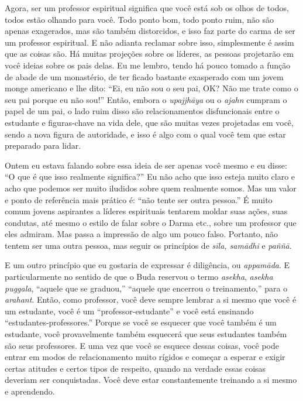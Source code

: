 Agora, ser um professor espiritual significa que você está sob os
olhos de todos, todos estão olhando para você. Todo ponto bom, todo
ponto ruim, não são apenas exagerados, mas são também distorcidos, e
isso faz parte do carma de ser um professor espiritual. E não adianta
reclamar sobre isso, simplesmente é assim que as coisas são. Há muitas
projeções sobre os líderes, as pessoas projetarão em você ideias sobre
os pais delas. Eu me lembro, tendo há pouco tomado a função de abade de
um monastério, de ter ficado bastante exasperado com um jovem monge
americano e lhe dito: “Ei, eu não sou o seu pai, OK? Não me trate como
o seu pai porque eu não sou!” Então, embora o \textit{upajjhāya} ou o
\textit{ajahn} cumpram o papel de um pai, o lado ruim disso são
relacionamentos disfuncionais entre o estudante e figuras-chave na vida
dele, que são muitas vezes projetadas em você, sendo a nova figura de
autoridade, e isso é algo com o qual você tem que estar preparado para
lidar. 

Ontem eu estava falando sobre essa ideia de ser apenas você mesmo e
eu disse: “O que é que isso realmente significa?” Eu não acho que isso
esteja muito claro e acho que podemos ser muito iludidos sobre quem
realmente somos. Mas um valor e ponto de referência mais prático é:
“não tente ser outra pessoa.” É muito comum jovens aspirantes a líderes
espirituais tentarem moldar suas ações, suas condutas, até mesmo o
estilo de falar sobre o Darma etc., sobre um professor que eles
admiram. Mas passa a impressão de algo um pouco falso. Portanto, não
tentem ser uma outra pessoa, mas seguir os princípios de
\textit{sīla, samādhi} e \textit{paññā}. 

E um outro princípio que eu gostaria de expressar é diligência, ou
\textit{appamāda}. E particularmente no sentido de que o Buda
reservou o termo \textit{asekha}, \textit{asekha puggala}, “aquele que
se graduou,” “aquele que encerrou o treinamento,” para o
\textit{arahant}. Então, como professor, você deve sempre lembrar a si
mesmo que você é um estudante, você é um “professor-estudante” e você
está ensinando “estudantes-professores.” Porque se você se esquecer que
você também é um estudante, você provavelmente também esquecerá que
seus estudantes também são seus professores. E uma vez que você se
esquece dessas coisas, você pode entrar em modos de relacionamento
muito rígidos e começar a esperar e exigir certas atitudes e certos
tipos de respeito, quando na verdade essas coisas deveriam ser
conquistadas. Você deve estar constantemente treinando a si mesmo e
aprendendo. 

